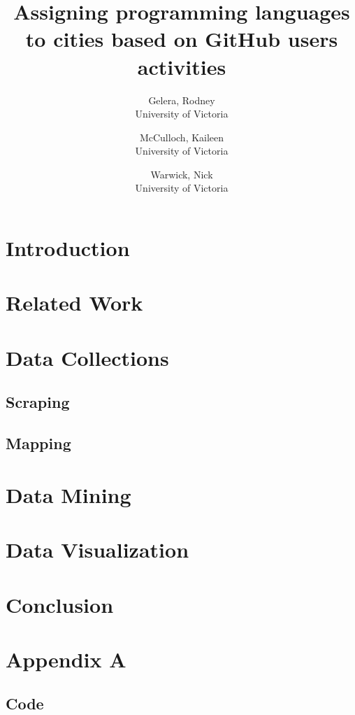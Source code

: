 \documentclass{article}
\begin{document}
\title{Assigning programming languages to cities based on GitHub users activities}

\author{
   Gelera, Rodney \\University of Victoria
   \and
   McCulloch, Kaileen \\University of Victoria
   \and
   Warwick, Nick \\University of Victoria
}

\maketitle

\tableofcontents
\newpage

\begin{abstract}
\end{abstract}

\section{Introduction}
\section{Related Work}
\section{Data Collections}
   \subsection{Scraping}
   \subsection{Mapping}
\section{Data Mining}
\section{Data Visualization}
\section{Conclusion}



\citation
\pagebreak
\onecolumn
\begingroup

%

\section{Appendix A}
\subsection{Code}
\endgroup
\end{document}
